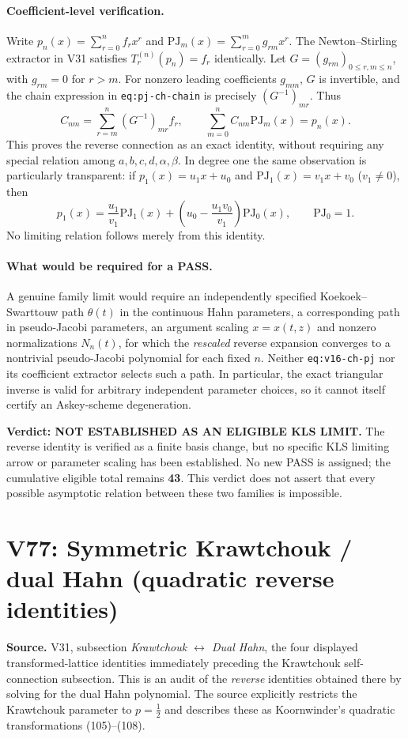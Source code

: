\documentclass[11pt]{article}
\begin{document}
\paragraph{Coefficient-level verification.}
Write $p_n(x)=\sum_{r=0}^n f_rx^r$ and
$\mathrm{PJ}_m(x)=\sum_{r=0}^m g_{rm}x^r$.
The Newton--Stirling extractor in V31 satisfies
$T_r^{(n)}(p_n)=f_r$ identically.  Let
$G=(g_{rm})_{0\le r,m\le n}$, with $g_{rm}=0$ for $r>m$.
For nonzero leading coefficients $g_{mm}$, $G$ is invertible,
and the chain expression in \texttt{eq:pj-ch-chain} is precisely
$(G^{-1})_{mr}$.  Thus
\[
 C_{nm}=\sum_{r=m}^n (G^{-1})_{mr}f_r,
 \qquad
 \sum_{m=0}^n C_{nm}\mathrm{PJ}_m(x)=p_n(x).
\]
This proves the reverse connection as an exact identity, without
requiring any special relation among $a,b,c,d,\alpha,\beta$.
In degree one the same observation is particularly transparent:
if $p_1(x)=u_1x+u_0$ and
$\mathrm{PJ}_1(x)=v_1x+v_0$ ($v_1\ne0$), then
\[
 p_1(x)=\frac{u_1}{v_1}\mathrm{PJ}_1(x)
 +\left(u_0-\frac{u_1v_0}{v_1}\right)\mathrm{PJ}_0(x),
 \qquad \mathrm{PJ}_0=1.
\]
No limiting relation follows merely from this identity.

\paragraph{What would be required for a PASS.}
A genuine family limit would require an independently specified
Koekoek--Swarttouw path $\theta(t)$ in the continuous Hahn
parameters, a corresponding path in pseudo-Jacobi parameters,
an argument scaling $x=x(t,z)$ and nonzero normalizations $N_n(t)$,
for which the \emph{rescaled} reverse expansion converges to a
nontrivial pseudo-Jacobi polynomial for each fixed $n$.  Neither
\texttt{eq:v16-ch-pj} nor its coefficient extractor selects such a
path.  In particular, the exact triangular inverse is valid for
arbitrary independent parameter choices, so it cannot itself certify
an Askey-scheme degeneration.

\noindent\textbf{Verdict: NOT ESTABLISHED AS AN ELIGIBLE KLS LIMIT.}
The reverse identity is verified as a finite basis change, but no
specific KLS limiting arrow or parameter scaling has been established.
No new PASS is assigned; the cumulative eligible total remains
\textbf{43}.  This verdict does not assert that every possible
asymptotic relation between these two families is impossible.


\section{V77: Symmetric Krawtchouk / dual Hahn (quadratic reverse identities)}
\noindent\textbf{Source.} V31, subsection
\emph{Krawtchouk $\leftrightarrow$ Dual Hahn}, the four displayed
transformed-lattice identities immediately preceding the Krawtchouk
self-connection subsection.  This is an audit of the \emph{reverse}
identities obtained there by solving for the dual Hahn polynomial.
The source explicitly restricts the Krawtchouk parameter to
$p=\tfrac12$ and describes these as Koornwinder's quadratic
transformations (105)--(108).
\end{document}
